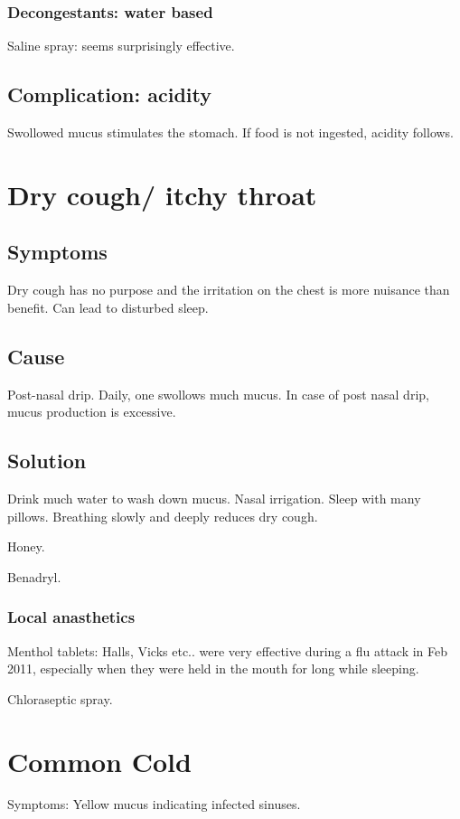 \documentclass[oneside, article]{memoir}
\begin{document}
\subsubsection{Decongestants: water based}
Saline spray: seems surprisingly effective.

\subsection{Complication: acidity}
Swollowed mucus stimulates the stomach. If food is not ingested, acidity follows.


\section{Dry cough/ itchy throat}
\subsection{Symptoms}
Dry cough has no purpose and the irritation on the chest is more nuisance than benefit. Can lead to disturbed sleep.

\subsection{Cause}
Post-nasal drip. Daily, one swollows much mucus. In case of post nasal drip, mucus production is excessive.

\subsection{Solution}
Drink much water to wash down mucus. Nasal irrigation. Sleep with many pillows. Breathing slowly and deeply reduces dry cough.

Honey.

Benadryl.

\subsubsection{Local anasthetics}
Menthol tablets: Halls, Vicks etc.. were very effective during a flu attack in Feb 2011, especially when they were held in the mouth for long while sleeping.

Chloraseptic spray.

\section{Common Cold}
Symptoms: Yellow mucus indicating infected sinuses.
\end{document}
